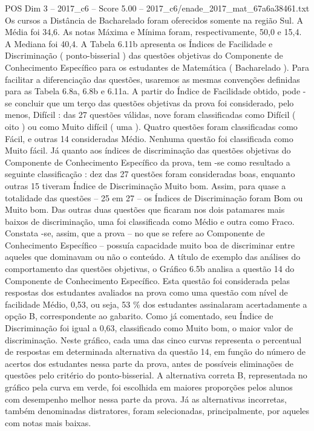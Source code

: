 \begin{textsample}{POS Dim 3 – 2017\_c6 – Score 5.00 – 2017\_c6/enade\_2017\_mat\_67a6a38461.txt}
Os cursos a Distância de Bacharelado foram oferecidos somente na região Sul.
A Média foi 34,6.
As notas Máxima e Mínima foram, respectivamente, 50,0 e 15,4.
A Mediana foi 40,4.
A Tabela 6.11b apresenta os Índices de Facilidade e Discriminação ( ponto-bisserial ) das questões objetivas do Componente de Conhecimento Específico para os estudantes de Matemática ( Bacharelado ).
Para facilitar a diferenciação das questões, usaremos as mesmas convenções definidas para as Tabela 6.8a, 6.8b e 6.11a.
A partir do Índice de Facilidade obtido, pode -se concluir que um terço das questões objetivas da prova foi considerado, pelo menos, Difícil : das 27 questões válidas, nove foram classificadas como Difícil ( oito ) ou como Muito difícil ( uma ).
Quatro questões foram classificadas como Fácil, e outras 14 consideradas Médio.
Nenhuma questão foi classificada como Muito fácil.
Já quanto aos índices de discriminação das questões objetivas do Componente de Conhecimento Específico da prova, tem -se como resultado a seguinte classificação : dez das 27 questões foram consideradas boas, enquanto outras 15 tiveram Índice de Discriminação Muito bom.
Assim, para quase a totalidade das questões – 25 em 27 – os Índices de Discriminação foram Bom ou Muito bom.
Das outras duas questões que ficaram nos dois patamares mais baixos de discriminação, uma foi classificada como Médio e outra como Fraco.
Constata -se, assim, que a prova – no que se refere ao Componente de Conhecimento Específico – possuía capacidade muito boa de discriminar entre aqueles que dominavam ou não o conteúdo.
A título de exemplo das análises do comportamento das questões objetivas, o Gráfico 6.5b analisa a questão 14 do Componente de Conhecimento Específico.
Esta questão foi considerada pelas respostas dos estudantes avaliados na prova como uma questão com nível de facilidade Médio, 0,53, ou seja, 53 \% dos estudantes assinalaram acertadamente a opção B, correspondente ao gabarito.
Como já comentado, seu Índice de Discriminação foi igual a 0,63, classificado como Muito bom, o maior valor de discriminação.
Neste gráfico, cada uma das cinco curvas representa o percentual de respostas em determinada alternativa da questão 14, em função do número de acertos dos estudantes nessa parte da prova, antes de possíveis eliminações de questões pelo critério do ponto-bisserial.
A alternativa correta B, representada no gráfico pela curva em verde, foi escolhida em maiores proporções pelos alunos com desempenho melhor nessa parte da prova.
Já as alternativas incorretas, também denominadas distratores, foram selecionadas, principalmente, por aqueles com notas mais baixas.

\end{textsample}
